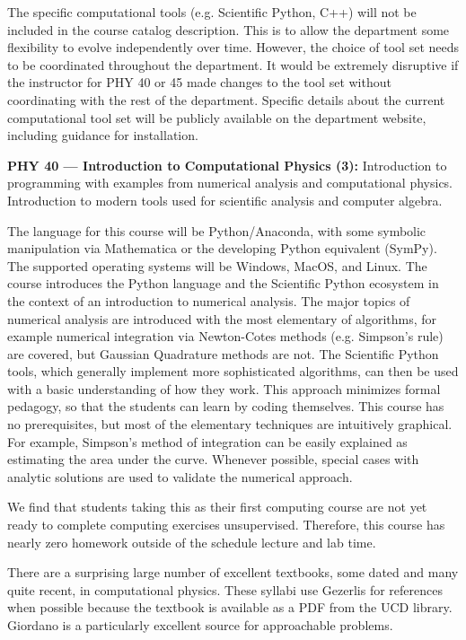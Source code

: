 \documentclass[12pt]{article}
\begin{document}
The specific computational tools (e.g. Scientific Python, C++) will
not be included in the course catalog description.  This is to allow
the department some flexibility to evolve independently over time.
However, the choice of tool set needs to be coordinated throughout the
department.  It would be extremely disruptive if the instructor for
PHY 40 or 45 made changes to the tool set without coordinating with
the rest of the department.  Specific details about the current
computational tool set will be publicly available on the department
website, including guidance for installation.

\vskip 1cm
\noindent
{\bf PHY 40 --- Introduction to Computational Physics (3):}
Introduction to programming with examples from numerical analysis and
computational physics. Introduction to modern tools used for
scientific analysis and computer algebra.

The language for this course will be Python/Anaconda, with some
symbolic manipulation via Mathematica or the developing Python
equivalent (SymPy).  The supported operating systems will be Windows,
MacOS, and Linux.  The course introduces the Python language and the
Scientific Python ecosystem in the context of an introduction to
numerical analysis.  The major topics of numerical analysis are
introduced with the most elementary of algorithms, for example
numerical integration via Newton-Cotes methods (e.g. Simpson's rule)
are covered, but Gaussian Quadrature methods are not.  The Scientific
Python tools, which generally implement more sophisticated algorithms,
can then be used with a basic understanding of how they work.  This
approach minimizes formal pedagogy, so that the students can learn by
coding themselves.  This course has no prerequisites, but most of the
elementary techniques are intuitively graphical.  For example,
Simpson's method of integration can be easily explained as estimating
the area under the curve.  Whenever possible, special cases with
analytic solutions are used to validate the numerical approach.

We find that students taking this as their first computing course are
not yet ready to complete computing exercises unsupervised.
Therefore, this course has nearly zero homework outside of the
schedule lecture and lab time.

There are a surprising large number of excellent textbooks, some dated
and many quite recent, in computational physics.  These syllabi use
Gezerlis for references when possible because the textbook is
available as a PDF from the UCD library.  Giordano is a particularly
excellent source for approachable problems.
\end{document}
